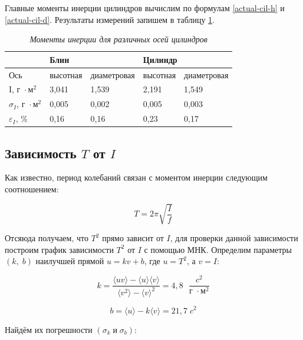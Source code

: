 \documentclass[a4paper,12pt]{article}
\begin{document}
Главные моменты инерции цилиндров вычислим по формулам \eqref{actual-cil-h} и \eqref{actual-cil-d}. Результаты измерений запишем в таблицу \ref{cilinders-i}.

\begin{table}[!ht]
    \centering
    \begin{tabular}{|l|l|l|l|l|}
    \hline
        ~ & \multicolumn{2}{l|}{Блин} & \multicolumn{2}{l|}{Цилиндр} \\ \hline
        Ось & высотная & диаметровая & высотная & диаметровая \\ \hline
        I, $\text{г } \cdot \text{м}^2$ & 3,041 & 1,539 & 2,191 & 1,549 \\ \hline
        $\sigma_{I}$, $\text{г } \cdot \text{м}^2$ & 0,005 & 0,002 & 0,005 & 0,003 \\ \hline
        $\varepsilon_{I}$, $\%$ & 0,16 & 0,16 & 0,23 & 0,17 \\ \hline
    \end{tabular}\caption{\textit{Моменты инерции для различных осей цилиндров}}\label{cilinders-i}
\end{table}

\subsection{Зависимость $T$ от $I$}

Как известно, период колебаний связан с моментом инерции следующим соотношением:

\begin{equation}
    T = 2 \pi \sqrt{\frac{I}{f}}
\end{equation}

Отсяюда получаем, что $T^2$ прямо зависит от $I$, для проверки данной зависимости построим график зависимости $T^2$ от $I$ с помощью МНК. Определим параметры $(k,\;b)$  наилучшей прямой $u = kv + b$, где $u = T^2$, а $v = I$:

\begin{equation}
    k = \frac{\langle uv\rangle - \langle u \rangle \langle v \rangle}{\langle v^2 \rangle - \langle v \rangle^2} = 4,8 \text{ } \frac{c^2}{\text{г } \cdot \text{м}^2}
\end{equation}

\begin{equation}
    b = \langle u \rangle - k\langle v \rangle = 21,7\; c^2 
\end{equation}

Найдём их погрешности $(\sigma_k\;и\;\sigma_b)$:
\end{document}
